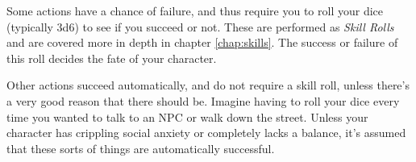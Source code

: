 Some actions have a chance of failure, and thus require you to roll your dice (typically 3d6) to see if you succeed or not. 
These are performed as \textit{Skill Rolls} and are covered more in depth in chapter \ref{chap:skills}. 
The success or failure of this roll decides the fate of your character.

Other actions succeed automatically, and do not require a skill roll, unless there's a very good reason that there should be.
Imagine having to roll your dice every time you wanted to talk to an NPC or walk down the street. 
Unless your character has crippling social anxiety or completely lacks a balance, it's assumed that these sorts of things are automatically successful.
